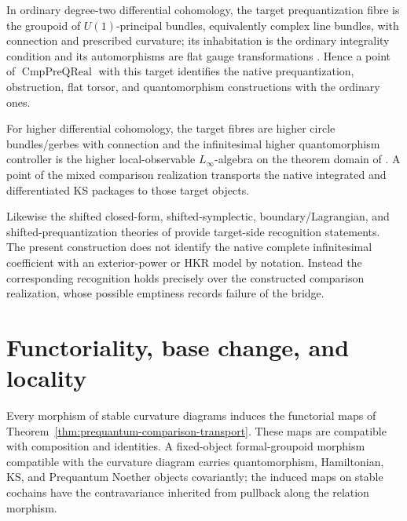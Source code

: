 In ordinary degree-two differential cohomology, the target prequantization fibre
is the groupoid of $U(1)$-principal bundles, equivalently complex line bundles,
with connection and prescribed curvature; its inhabitation is the ordinary
integrality condition and its automorphisms are flat gauge transformations
\cite{Kostant1970}.  Hence a point of $\operatorname{CmpPreQReal}$ with this
target identifies the native prequantization, obstruction, flat torsor, and
quantomorphism constructions with the ordinary ones.

For higher differential cohomology, the target fibres are higher circle
bundles/gerbes with connection and the infinitesimal higher quantomorphism
controller is the higher local-observable $L_\infty$-algebra on the theorem domain
of \cite{Rogers2012,FiorenzaRogersSchreiber2013,Schreiber2016}.  A point of the
mixed comparison realization transports the native integrated and differentiated
KS packages to those target objects.

Likewise the shifted closed-form, shifted-symplectic, boundary/Lagrangian, and
shifted-prequantization theories of
\cite{PantevToenVaquieVezzosi2013,Calaque2015,Safronov2020} provide target-side
recognition statements.  The present construction does not identify the native
complete infinitesimal coefficient with an exterior-power or HKR model by
notation.  Instead the corresponding recognition holds precisely over the
constructed comparison realization, whose possible emptiness records failure of
the bridge.

\section{Functoriality, base change, and locality}
\label{sec:prequantum-functoriality}

\begin{theorem}
\label{thm:prequantum-fixed-base-functoriality}
Every morphism of stable curvature diagrams induces the functorial maps of
Theorem~\ref{thm:prequantum-comparison-transport}.  These maps are compatible with
composition and identities.  A fixed-object formal-groupoid morphism compatible
with the curvature diagram carries quantomorphism, Hamiltonian, KS, and Prequantum
Noether objects covariantly; the induced maps on stable cochains have the
contravariance inherited from pullback along the relation morphism.
\end{theorem}

